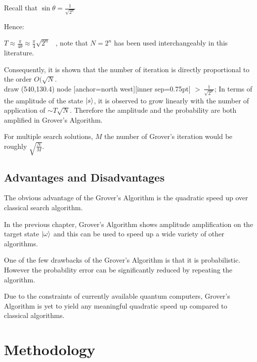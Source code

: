 \documentclass{article}
\begin{document}
\noindent
Recall that $\sin\theta = \frac{1}{\sqrt{2^n}}$
\vspace{5mm}

\noindent
Hence:
\vspace{5mm}

\noindent
\qquad $T \approx \frac{\pi}{4\theta} \approx \frac{\pi}{4}\sqrt{2^n}$ \ , note that $N = 2^n$ has been used interchangeably in this literature.
\vspace{5mm}

\noindent
Consequently, it is shown that the number of iteration is directly proportional to the order $O(\sqrt{N}$. 
\\draw (540,130.4) node [anchor=north west][inner sep=0.75pt]    {$ >\ \frac{1}{\sqrt{2^{n}}}$};
In terms of the amplitude of the state $\ket{s}$, it is observed to grow linearly with the number of application of $\sim T\sqrt{N}$. Therefore the amplitude and the probability are both amplified in Grover's Algorithm.
\vspace{5mm}

\noindent
For multiple search solutions, $M$ the number of Grover's iteration would be roughly $\sqrt{\frac{N}{M}}$.
\vspace{10mm}

\subsection{Advantages and Disadvantages}
\vspace{5mm}

\noindent
The obvious advantage of the Grover's Algorithm is the quadratic speed up over classical search algorithm. 
\vspace{5mm}

\noindent
In the previous chapter, Grover's Algorithm shows amplitude amplification on the target state $\ket{\omega}$ and this can be used to speed up a wide variety of other algorithms. 
\vspace{5mm}

\noindent
One of the few drawbacks of the Grover's Algorithm is that it is probabilistic. However the probability error can be significantly reduced by repeating the algorithm.
\vspace{5mm}

\noindent
Due to the constraints of currently available quantum computers, Grover's Algorithm is yet to yield any  meaningful quadratic speed up compared to classical algorithms.   


\section{Methodology}
\end{document}
